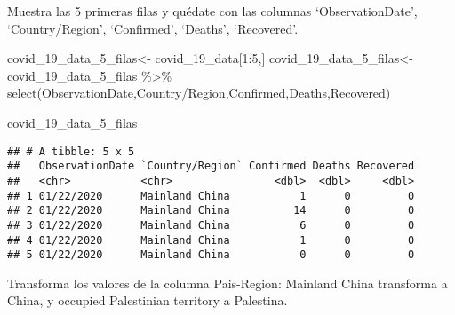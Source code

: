 \documentclass[
]{book}
\newenvironment{Shaded}{\begin{snugshade}}{\end{snugshade}}
\newcommand{\DecValTok}[1]{\textcolor[rgb]{0.00,0.00,0.81}{#1}}
\newcommand{\FunctionTok}[1]{\textcolor[rgb]{0.00,0.00,0.00}{#1}}
\newcommand{\NormalTok}[1]{#1}
\newcommand{\OtherTok}[1]{\textcolor[rgb]{0.56,0.35,0.01}{#1}}
\newcommand{\SpecialCharTok}[1]{\textcolor[rgb]{0.00,0.00,0.00}{#1}}
\newcommand{\StringTok}[1]{\textcolor[rgb]{0.31,0.60,0.02}{#1}}
\begin{document}
Muestra las 5 primeras filas y quédate con las columnas `ObservationDate', `Country/Region', `Confirmed', `Deaths', `Recovered'.

\begin{Shaded}
\begin{Highlighting}[]
\NormalTok{covid\_19\_data\_5\_filas}\OtherTok{\textless{}{-}}\NormalTok{ covid\_19\_data[}\DecValTok{1}\SpecialCharTok{:}\DecValTok{5}\NormalTok{,]}
\NormalTok{covid\_19\_data\_5\_filas}\OtherTok{\textless{}{-}}\NormalTok{ covid\_19\_data\_5\_filas }\SpecialCharTok{\%\textgreater{}\%} \FunctionTok{select}\NormalTok{(ObservationDate,}\StringTok{\textquotesingle{}Country/Region\textquotesingle{}}\NormalTok{,Confirmed,Deaths,Recovered)}

\NormalTok{covid\_19\_data\_5\_filas}
\end{Highlighting}
\end{Shaded}

\begin{verbatim}
## # A tibble: 5 x 5
##   ObservationDate `Country/Region` Confirmed Deaths Recovered
##   <chr>           <chr>                <dbl>  <dbl>     <dbl>
## 1 01/22/2020      Mainland China           1      0         0
## 2 01/22/2020      Mainland China          14      0         0
## 3 01/22/2020      Mainland China           6      0         0
## 4 01/22/2020      Mainland China           1      0         0
## 5 01/22/2020      Mainland China           0      0         0
\end{verbatim}

Transforma los valores de la columna Pais-Region: Mainland China transforma a China, y occupied Palestinian territory a Palestina.
\end{document}
